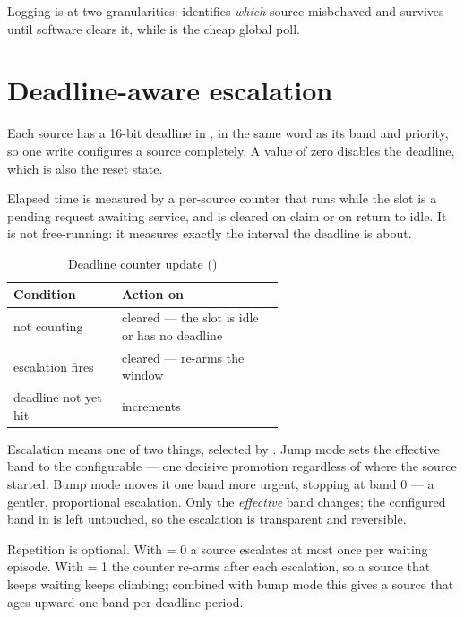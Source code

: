 Logging is at two granularities:  identifies \emph{which}
source misbehaved and survives until software clears it, while
 is the cheap global poll.

\section{Deadline-aware escalation}
\label{sec:deadline}

Each source has a 16-bit deadline in , in the same
word as its band and priority, so one write configures a source completely. A
value of zero disables the deadline, which is also the reset state.

Elapsed time is measured by a per-source counter that runs while the slot is a
pending request awaiting service, and is cleared on claim or on return to idle.
It is not free-running: it measures exactly the interval the deadline is about.

\begin{table}[H]
\centering
\caption{Deadline counter update ()}
\label{tab:ddlcnt}
\begin{tabular}{@{}lL{0.60\linewidth}@{}}
\toprule
\textbf{Condition} & \textbf{Action on } \\
\midrule
not counting        & cleared --- the slot is idle or has no deadline \\
escalation fires    & cleared --- re-arms the window \\
deadline not yet hit& increments \\
\bottomrule
\end{tabular}
\end{table}

Escalation means one of two things, selected by . Jump
mode sets the effective band to the configurable  --- one decisive
promotion regardless of where the source started. Bump mode moves it one band
more urgent, stopping at band 0 --- a gentler, proportional escalation. Only the
\emph{effective} band changes; the configured band in  is left
untouched, so the escalation is transparent and reversible.

Repetition is optional. With  = 0 a source escalates at most once per
waiting episode. With  = 1 the counter re-arms after each escalation,
so a source that keeps waiting keeps climbing; combined with bump mode this gives
a source that ages upward one band per deadline period.

